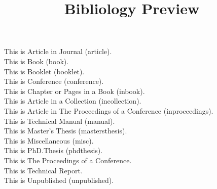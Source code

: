 \documentclass[a4paper]{article}
\title{Bibliology Preview}
\date{}
\begin{document}
\maketitle
{}
\fontsize{18}{22}\selectfont
{}
\noindent
This is Article in Journal (article). \cite{article}\\
This is Book (book). \cite{book}\\
This is Booklet (booklet). \cite{booklet}\\
This is Conference (conference). \cite{conference}\\
This is Chapter or Pages in a Book (inbook). \cite{inbook}\\
This is Article in a Collection (incollection). \cite{incollection}\\
This is Article in The Proceedings of a Conference (inproceedings). \cite{inproceedings}\\
This is Technical Manual (manual). \cite{manual}\\
This is Master's Thesis (mastersthesis). \cite{mastersthesis}\\
This is Miscellaneous (misc). \cite{misc}\\
This is PhD.Thesis (phdthesis). \cite{phdthesis}\\
This is The Proceedings of a Conference. \cite{proceedings}\\
This is Technical Report. \cite{techreport}\\
This is Unpublished (unpublished). \cite{unpublished}\\


\end{document}
